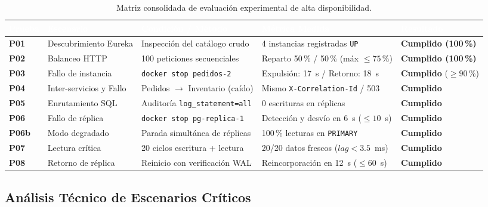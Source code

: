 \documentclass[12pt,a4paper]{article}
\begin{document}
\begin{table}[H]
\centering
\small
\begin{tabularx}{\textwidth}{@{}L{1.4cm}L{3.2cm}L{3.8cm}L{3.4cm}Y@{}}
\toprule[1.2pt]
\textcolor{white}{\textbf{Prueba}} & 
\textcolor{white}{\textbf{Escenario}} & 
\textcolor{white}{\textbf{Condici\'{o}n / M\'{e}todo}} & 
\textcolor{white}{\textbf{M\'{e}trica Medida}} & 
\textcolor{white}{\textbf{Resultado}} \\
\midrule[0.8pt]
\textbf{P01} & Descubrimiento Eureka & Inspecci\'{o}n del cat\'{a}logo crudo & 4 instancias registradas \texttt{UP} & \textbf{Cumplido (100\,\%)} \\
\textbf{P02} & Balanceo HTTP & 100 peticiones secuenciales & Reparto 50\,\% / 50\,\% (m\'{a}x $\le 75\,\%$) & \textbf{Cumplido (100\,\%)} \\
\textbf{P03} & Fallo de instancia & \texttt{docker stop pedidos-2} & Expulsi\'{o}n: 17~s / Retorno: 18~s & \textbf{Cumplido} ($\ge 90\,\%$) \\
\textbf{P04} & Inter-servicios y Fallo & Pedidos $\rightarrow$ Inventario (ca\'{i}do) & Mismo \texttt{X-Correlation-Id} / 503 & \textbf{Cumplido} \\
\textbf{P05} & Enrutamiento SQL & Auditor\'{i}a \texttt{log\_statement=all} & 0 escrituras en r\'{e}plicas & \textbf{Cumplido} \\
\textbf{P06} & Fallo de r\'{e}plica & \texttt{docker stop pg-replica-1} & Detecci\'{o}n y desv\'{i}o en 6~s ($\le 10$~s) & \textbf{Cumplido} \\
\textbf{P06b}& Modo degradado & Parada simult\'{a}nea de r\'{e}plicas & 100\,\% lecturas en \texttt{PRIMARY} & \textbf{Cumplido} \\
\textbf{P07} & Lectura cr\'{i}tica & 20 ciclos escritura + lectura & 20/20 datos frescos ($lag < 3.5$~ms) & \textbf{Cumplido} \\
\textbf{P08} & Retorno de r\'{e}plica & Reinicio con verificaci\'{o}n WAL & Reincorporaci\'{o}n en 12~s ($\le 60$~s) & \textbf{Cumplido} \\
\bottomrule[1.2pt]
\end{tabularx}
\caption{Matriz consolidada de evaluaci\'{o}n experimental de alta disponibilidad.}
\label{tab:pruebas}
\end{table}

\subsection{An\'{a}lisis T\'{e}cnico de Escenarios Cr\'{i}ticos}
\end{document}
